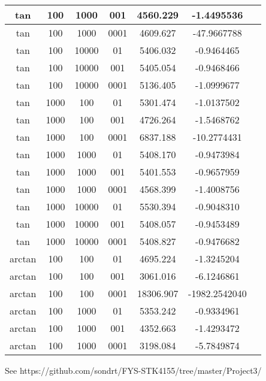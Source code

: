 \begin{tabular}{|c|c|c|c|c|c|c|}
\hline
tan 	& 100  		&	1000  	& 	001		&	 4560.229 	&	-1.4495536   	\\ 
\hline
tan 	& 100  		&	1000  	&	 0001	&	 4609.627 	&	-47.9667788	\\ 
\hline
tan 	& 100  		&	10000 	& 	01 		&	5406.032	&	 -0.9464465	\\ 
\hline
tan 	& 100  		&	10000 	& 	001 	&	5405.054	&	 -0.9468466	\\ 
\hline
tan 	& 100  		&	10000 	& 	0001 	&	5136.405	&	 -1.0999677	\\ 
\hline
tan 	& 1000 		&	 100  	& 	01 		&	5301.474	&	 -1.0137502	\\ 
\hline
tan 	& 1000 		&	 100  	& 	001 	&	4726.264	&	 -1.5468762	\\ 
\hline
tan 	& 1000 		&	 100  	& 	0001 	&	6837.188 	&	-10.2774431	\\ 
\hline
tan 	& 1000 		&	 1000 	 & 	01		&	 5408.170	&	 -0.9473984	\\ 
\hline
tan 	& 1000 		&	 1000 	 & 	001 	&	5401.553 	&	-0.9657959\\ 
\hline
tan 	& 1000 		&	 1000 	 & 	0001	&	 4568.399	&	 -1.4008756\\ 
\hline
tan 	& 1000 		&	 10000	 & 	01		&	 5530.394	&	 -0.9048310\\ 
\hline
tan 	& 1000 		&	 10000	 & 	001		&	 5408.057	&	 -0.9453489\\ 
\hline
tan 	& 1000 		&	 10000	 & 	0001	&	 5408.827	&	 -0.9476682\\ 
\hline
arctan& 100 &100	& 01& 4695.224& -1.3245204	\\ 
\hline
arctan& 100 &100	& 001 &3061.016 & -6.1246861	\\ 
\hline
arctan& 100 &100	& 0001 &18306.907& -1982.2542040	\\ 
\hline
arctan& 100 &1000 	&01 &5353.242& -0.9334961	\\ 
\hline
arctan& 100 &1000	& 001 &4352.663& -1.4293472	\\ 
\hline
arctan& 100 &1000	& 0001 &3198.084& -5.7849874	\\ 
\hline
\end{tabular}

See https://github.com/sondrt/FYS-STK4155/tree/master/Project3/
